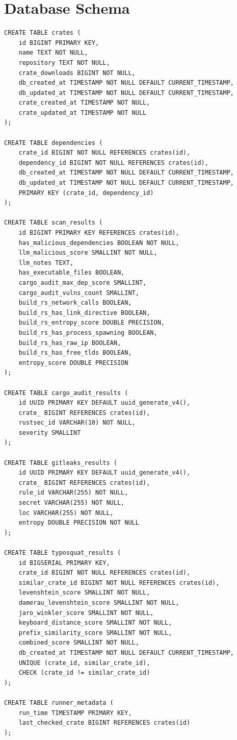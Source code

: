 \chapter{Database Schema}\label{appendix:db-schema}

\begin{verbatim}
CREATE TABLE crates (
    id BIGINT PRIMARY KEY,
    name TEXT NOT NULL,
    repository TEXT NOT NULL,
    crate_downloads BIGINT NOT NULL,
    db_created_at TIMESTAMP NOT NULL DEFAULT CURRENT_TIMESTAMP,
    db_updated_at TIMESTAMP NOT NULL DEFAULT CURRENT_TIMESTAMP,
    crate_created_at TIMESTAMP NOT NULL,
    crate_updated_at TIMESTAMP NOT NULL
);

CREATE TABLE dependencies (
    crate_id BIGINT NOT NULL REFERENCES crates(id),
    dependency_id BIGINT NOT NULL REFERENCES crates(id),
    db_created_at TIMESTAMP NOT NULL DEFAULT CURRENT_TIMESTAMP,
    db_updated_at TIMESTAMP NOT NULL DEFAULT CURRENT_TIMESTAMP,
    PRIMARY KEY (crate_id, dependency_id)
);

CREATE TABLE scan_results (
    id BIGINT PRIMARY KEY REFERENCES crates(id),
    has_malicious_dependencies BOOLEAN NOT NULL,
    llm_malicious_score SMALLINT NOT NULL,
    llm_notes TEXT,
    has_executable_files BOOLEAN,
    cargo_audit_max_dep_score SMALLINT,
    cargo_audit_vulns_count SMALLINT,
    build_rs_network_calls BOOLEAN,
    build_rs_has_link_directive BOOLEAN,
    build_rs_entropy_score DOUBLE PRECISION,
    build_rs_has_process_spawning BOOLEAN,
    build_rs_has_raw_ip BOOLEAN,
    build_rs_has_free_tlds BOOLEAN,
    entropy_score DOUBLE PRECISION
);

CREATE TABLE cargo_audit_results (
    id UUID PRIMARY KEY DEFAULT uuid_generate_v4(),
    crate_ BIGINT REFERENCES crates(id),
    rustsec_id VARCHAR(10) NOT NULL,
    severity SMALLINT
);

CREATE TABLE gitleaks_results (
    id UUID PRIMARY KEY DEFAULT uuid_generate_v4(),
    crate_ BIGINT REFERENCES crates(id),
    rule_id VARCHAR(255) NOT NULL,
    secret VARCHAR(255) NOT NULL,
    loc VARCHAR(255) NOT NULL,
    entropy DOUBLE PRECISION NOT NULL
);

CREATE TABLE typosquat_results (
    id BIGSERIAL PRIMARY KEY,
    crate_id BIGINT NOT NULL REFERENCES crates(id),
    similar_crate_id BIGINT NOT NULL REFERENCES crates(id),
    levenshtein_score SMALLINT NOT NULL,
    damerau_levenshtein_score SMALLINT NOT NULL,
    jaro_winkler_score SMALLINT NOT NULL,
    keyboard_distance_score SMALLINT NOT NULL,
    prefix_similarity_score SMALLINT NOT NULL,
    combined_score SMALLINT NOT NULL,
    db_created_at TIMESTAMP NOT NULL DEFAULT CURRENT_TIMESTAMP,
    UNIQUE (crate_id, similar_crate_id),
    CHECK (crate_id != similar_crate_id)
);

CREATE TABLE runner_metadata (
    run_time TIMESTAMP PRIMARY KEY,
    last_checked_crate BIGINT REFERENCES crates(id)
);
\end{verbatim}